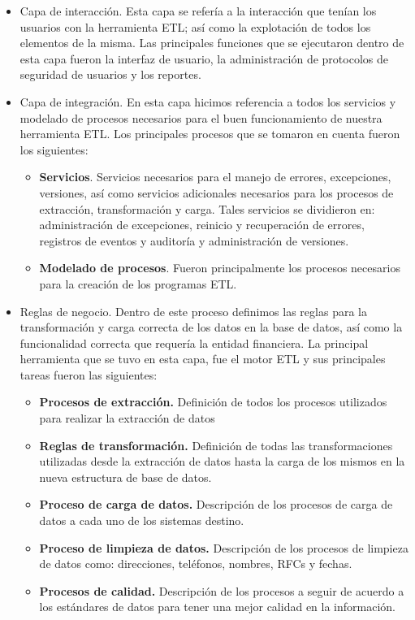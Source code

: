 \begin{itemize}

\item Capa de interacción. Esta capa se refería a la interacción que tenían
  los usuarios con la herramienta ETL; así como la explotación de todos los
  elementos de la misma. Las principales funciones que se ejecutaron dentro de
  esta capa fueron la interfaz de usuario, la administración de protocolos de
  seguridad de usuarios y los reportes.

\item Capa de integración. En esta capa hicimos referencia a todos los
  servicios y modelado de procesos necesarios para el buen funcionamiento de
  nuestra herramienta ETL. Los principales procesos que se tomaron en cuenta
  fueron los siguientes:

  \begin{itemize}
  \item \textbf{Servicios}. Servicios necesarios para el manejo de errores,
    excepciones, versiones, así como servicios adicionales necesarios para los
    procesos de extracción, transformación y carga. Tales servicios se
    dividieron en: administración de excepciones, reinicio y recuperación de
    errores, registros de eventos y auditoría y administración de versiones.
  \item \textbf{Modelado de procesos}. Fueron principalmente los procesos
    necesarios para la creación de los programas ETL.
  \end{itemize}

\item Reglas de negocio. Dentro de este proceso definimos las reglas para la
  transformación y carga correcta de los datos en la base de datos, así como la
  funcionalidad correcta que requería la entidad financiera. La principal
  herramienta que se tuvo en esta capa, fue el motor ETL y sus principales
  tareas fueron las siguientes:

  \begin{itemize}
  \item \textbf{Procesos de extracción.} Definición de todos los procesos
    utilizados para realizar la extracción de datos
  \item \textbf{Reglas de transformación.} Definición de todas las
    transformaciones utilizadas desde la extracción de datos hasta la carga de
    los mismos en la nueva estructura de base de datos.
  \item \textbf{Proceso de carga de datos.} Descripción de los procesos de carga
    de datos a cada uno de los sistemas destino.
  \item \textbf{Proceso de limpieza de datos.} Descripción de los procesos de
    limpieza de datos como: direcciones, teléfonos, nombres, RFCs y fechas.
  \item \textbf{Procesos de calidad.} Descripción de los procesos a seguir de
    acuerdo a los estándares de datos para tener una mejor calidad en la
    información.
  \end{itemize}

\end{itemize}

